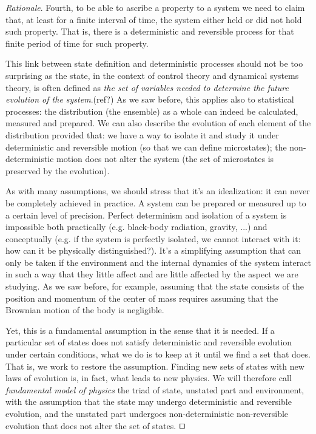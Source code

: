 \documentclass[smallextended]{svjour3}
\numberwithin{equation}{section}
\newenvironment{rationale}{\emph{Rationale}.}{\hfill\(\qed\)}
\theoremstyle{definition}
\newenvironment{rationale}{\emph{Rationale}.}{\qed}
\begin{document}
\begin{rationale}
Fourth, to be able to ascribe a property to a system we need to claim that, at least for a finite interval of time, the system either held or did not hold such property. That is, there is a deterministic and reversible process for that finite period of time for such property.

This link between state definition and deterministic processes should not be too surprising as the state, in the context of control theory and dynamical systems theory, is often defined as \emph{the set of variables needed to determine the future evolution of the system}.(ref?) As we saw before, this applies also to statistical processes: the distribution (the ensemble) as a whole can indeed be calculated, measured and prepared. We can also describe the evolution of each element of the distribution provided that: we have a way to isolate it and study it under deterministic and reversible motion (so that we can define microstates); the non-deterministic motion does not alter the system (the set of microstates is preserved by the evolution).

As with many assumptions, we should stress that it's an idealization: it can never be completely achieved in practice. A system can be prepared or measured up to a certain level of precision. Perfect determinism and isolation of a system is impossible both practically (e.g. black-body radiation, gravity, ...) and conceptually (e.g. if the system is perfectly isolated, we cannot interact with it: how can it be physically distinguished?). It's a simplifying assumption that can only be taken if the environment and the internal dynamics of the system interact in such a way that they little affect and are little affected by the aspect we are studying. As we saw before, for example, assuming that the state consists of the position and momentum of the center of mass requires assuming that the Brownian motion of the body is negligible.

Yet, this is a fundamental assumption in the sense that it is needed. If a particular set of states does not satisfy deterministic and reversible evolution under certain conditions, what we do is to keep at it until we find a set that does. That is, we work to restore the assumption. Finding new sets of states with new laws of evolution is, in fact, what leads to new physics. We will therefore call \emph{fundamental model of physics} the triad of state, unstated part and environment, with the assumption that the state may undergo deterministic and reversible evolution, and the unstated part undergoes non-deterministic non-reversible evolution that does not alter the set of states.
\end{rationale}
\end{document}

